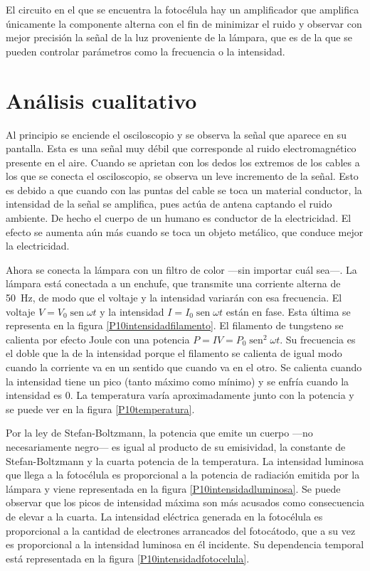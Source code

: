 \documentclass[12pt]{article}
\numberwithin{table}{section}
\numberwithin{figure}{section}
\numberwithin{equation}{section}
\DeclareMathOperator{\sen}{sen}
\begin{document}
El circuito en el que se encuentra la fotocélula hay un amplificador que amplifica únicamente la componente alterna con el fin de minimizar el ruido y observar con mejor precisión la señal de la luz proveniente de la lámpara, que es de la que se pueden controlar parámetros como la frecuencia o la intensidad.

\section{Análisis cualitativo}
Al principio se enciende el osciloscopio y se observa la señal que aparece en su pantalla. Esta es una señal muy débil que corresponde al ruido electromagnético presente en el aire. Cuando se aprietan con los dedos los extremos de los cables a los que se conecta el osciloscopio, se observa un leve incremento de la señal. Esto es debido a que cuando con las puntas del cable se toca un material conductor, la intensidad de la señal se amplifica, pues actúa de antena captando el ruido ambiente. De hecho el cuerpo de un humano es conductor de la electricidad. El efecto se aumenta aún más cuando se toca un objeto metálico, que conduce mejor la electricidad.

Ahora se conecta la lámpara con un filtro de color ---sin importar cuál sea---. La lámpara está conectada a un enchufe, que transmite una corriente alterna de \SI{50}{Hz}, de modo que el voltaje y la intensidad variarán con esa frecuencia. El voltaje $V=V_0\sen\omega t$ y la intensidad $I=I_0\sen\omega t$ están en fase. Esta última se representa en la figura \ref{P10intensidadfilamento}. El filamento de tungsteno se calienta por efecto Joule con una potencia $P=IV=P_0\sen^2\omega t$. Su frecuencia es el doble que la de la intensidad porque el filamento se calienta de igual modo cuando la corriente va en un sentido que cuando va en el otro. Se calienta cuando la intensidad tiene un pico (tanto máximo como mínimo) y se enfría cuando la intensidad es 0. La temperatura varía aproximadamente junto con la potencia y se puede ver en la figura \ref{P10temperatura}.

Por la ley de Stefan-Boltzmann, la potencia que emite un cuerpo ---no necesariamente negro--- es igual al producto de su emisividad, la constante de Stefan-Boltzmann y la cuarta potencia de la temperatura. La intensidad luminosa que llega a la fotocélula es proporcional a la potencia de radiación emitida por la lámpara y viene representada en la figura \ref{P10intensidadluminosa}. Se puede observar que los picos de intensidad máxima son más acusados como consecuencia de elevar a la cuarta. La intensidad eléctrica generada en la fotocélula es proporcional a la cantidad de electrones arrancados del fotocátodo, que a su vez es proporcional a la intensidad luminosa en él incidente. Su dependencia temporal está representada en la figura \ref{P10intensidadfotocelula}.
\end{document}
